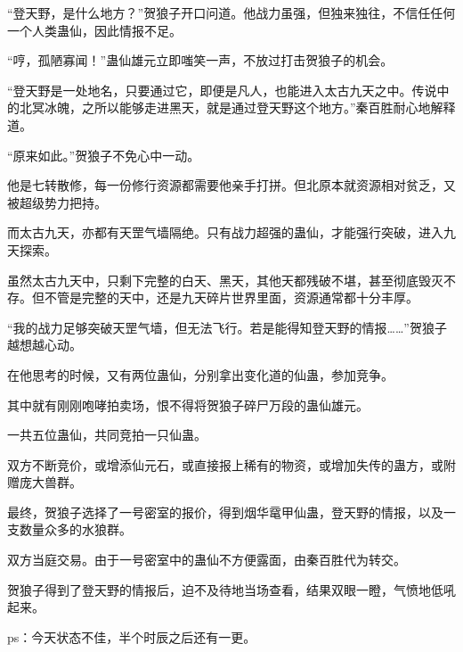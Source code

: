 \begin{this_body}
“登天野，是什么地方？”贺狼子开口问道。他战力虽强，但独来独往，不信任任何一个人类蛊仙，因此情报不足。

“哼，孤陋寡闻！”蛊仙雄元立即嗤笑一声，不放过打击贺狼子的机会。

“登天野是一处地名，只要通过它，即便是凡人，也能进入太古九天之中。传说中的北冥冰魄，之所以能够走进黑天，就是通过登天野这个地方。”秦百胜耐心地解释道。

“原来如此。”贺狼子不免心中一动。

他是七转散修，每一份修行资源都需要他亲手打拼。但北原本就资源相对贫乏，又被超级势力把持。

而太古九天，亦都有天罡气墙隔绝。只有战力超强的蛊仙，才能强行突破，进入九天探索。

虽然太古九天中，只剩下完整的白天、黑天，其他天都残破不堪，甚至彻底毁灭不存。但不管是完整的天中，还是九天碎片世界里面，资源通常都十分丰厚。

“我的战力足够突破天罡气墙，但无法飞行。若是能得知登天野的情报……”贺狼子越想越心动。

在他思考的时候，又有两位蛊仙，分别拿出变化道的仙蛊，参加竞争。

其中就有刚刚咆哮拍卖场，恨不得将贺狼子碎尸万段的蛊仙雄元。

一共五位蛊仙，共同竞拍一只仙蛊。

双方不断竞价，或增添仙元石，或直接报上稀有的物资，或增加失传的蛊方，或附赠庞大兽群。

最终，贺狼子选择了一号密室的报价，得到烟华鼋甲仙蛊，登天野的情报，以及一支数量众多的水狼群。

双方当庭交易。由于一号密室中的蛊仙不方便露面，由秦百胜代为转交。

贺狼子得到了登天野的情报后，迫不及待地当场查看，结果双眼一瞪，气愤地低吼起来。

ps：今天状态不佳，半个时辰之后还有一更。

\end{this_body}


